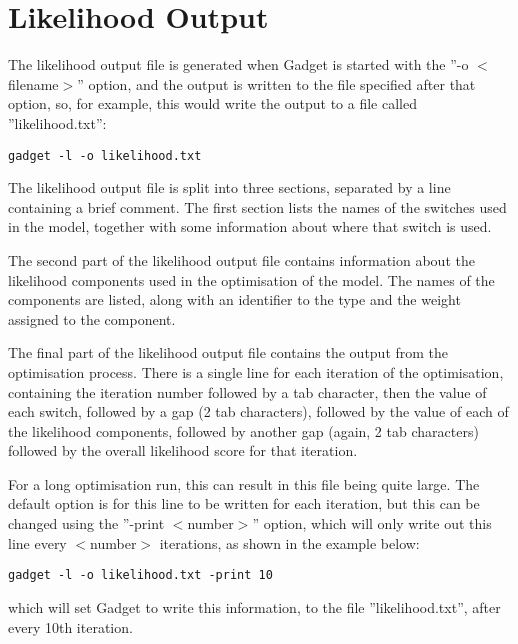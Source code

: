 \documentclass[10pt,twoside]{book}
\begin{document}
\section{Likelihood Output}\label{sec:likelihoodoutput}
The likelihood output file is generated when Gadget is started with the ''-o $<$filename$>$'' option, and the output is written to the file specified after that option, so, for example, this would write the output to a file called ''likelihood.txt'':

{\small\begin{verbatim}
gadget -l -o likelihood.txt
\end{verbatim}}

The likelihood output file is split into three sections, separated by a line containing a brief comment.  The first section lists the names of the switches used in the model, together with some information about where that switch is used.

\bigskip
The second part of the likelihood output file contains information about the likelihood components used in the optimisation of the model.  The names of the components are listed, along with an identifier to the type and the weight assigned to the component.

\bigskip
The final part of the likelihood output file contains the output from the optimisation process.  There is a single line for each iteration of the optimisation, containing the iteration number followed by a tab character, then the value of each switch, followed by a gap (2 tab characters), followed by the value of each of the likelihood components, followed by another gap (again, 2 tab characters) followed by the overall likelihood score for that iteration.

\bigskip
For a long optimisation run, this can result in this file being quite large.  The default option is for this line to be written for each iteration, but this can be changed using the ''-print $<$number$>$'' option, which will only write out this line every $<$number$>$ iterations, as shown in the example below:

{\small\begin{verbatim}
gadget -l -o likelihood.txt -print 10
\end{verbatim}}

which will set Gadget to write this information, to the file ''likelihood.txt'', after every 10th iteration.

\end{document}
